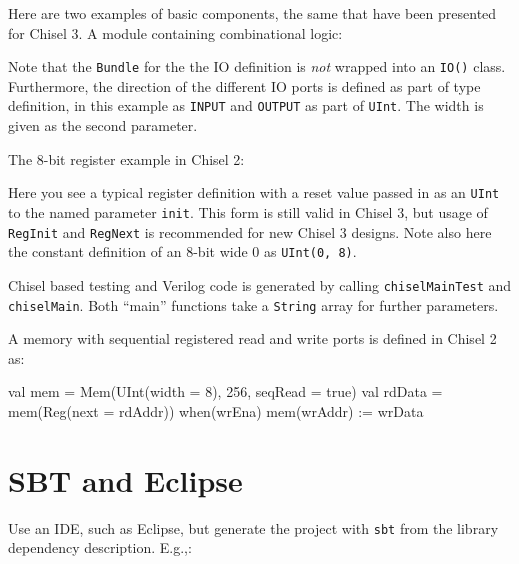 \documentclass[%
    10pt, %
    headinclude, footexclude,
    openright, %
    notitlepage,
    cleardoubleempty,
    headsepline,
    pointlessnumbers,
    bibtotoc, idxtotoc,
    ]{scrbook}
\newcommand{\code}[1]{{\small{\texttt{#1}}}}
\begin{document}
Here are two examples of basic components, the same that have been presented
for Chisel 3. A module containing combinational logic:



Note that the \code{Bundle} for the the IO definition is \emph{not} wrapped into
an \code{IO()} class.  Furthermore, the direction of the different IO ports is defined
as part of type definition, in this example as \code{INPUT} and \code{OUTPUT}
as part of \code{UInt}. The width is given as the second parameter.

\begin{minipage}{\linewidth}
The 8-bit register example in Chisel 2:


\end{minipage}

Here you see a typical register definition with a reset value passed in as
an \code{UInt} to the named parameter \code{init}. This form is still valid in Chisel 3,
but usage of \code{RegInit} and \code{RegNext} is recommended for new Chisel 3 designs.
Note also here the constant definition of an 8-bit wide 0 as \code{UInt(0, 8)}.

Chisel based testing and Verilog code is generated by calling \code{chiselMainTest}
and \code{chiselMain}. Both ``main'' functions take a \code{String} array for further parameters.





A memory with sequential registered read and write ports is defined in Chisel 2 as:

\begin{chisel}
  val mem = Mem(UInt(width = 8), 256, seqRead = true)
  val rdData = mem(Reg(next = rdAddr))
  when(wrEna) {
    mem(wrAddr) := wrData
  }
\end{chisel}



\section{SBT and Eclipse}

Use an IDE, such as Eclipse, but generate the project with \code{sbt}
from the library dependency description. E.g.,:
\end{document}
